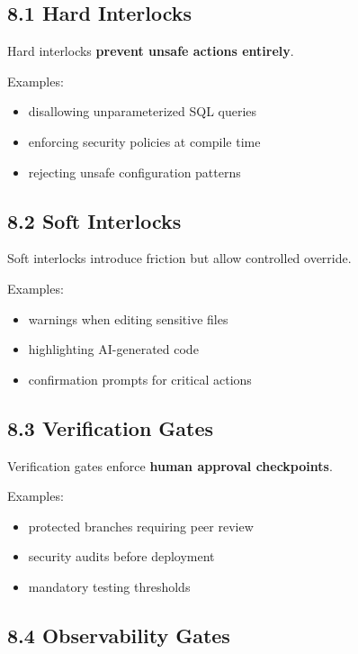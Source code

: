 \documentclass[
]{article}
\providecommand{\tightlist}{%
  \setlength{\itemsep}{0pt}\setlength{\parskip}{0pt}}
\begin{document}
\subsection{8.1 Hard Interlocks}\label{81-hard-interlocks}

Hard interlocks \textbf{prevent unsafe actions entirely}.

Examples:

\begin{itemize}
\tightlist
\item
  disallowing unparameterized SQL queries
\item
  enforcing security policies at compile time
\item
  rejecting unsafe configuration patterns
\end{itemize}

\subsection{8.2 Soft Interlocks}\label{82-soft-interlocks}

Soft interlocks introduce friction but allow controlled override.

Examples:

\begin{itemize}
\tightlist
\item
  warnings when editing sensitive files
\item
  highlighting AI-generated code
\item
  confirmation prompts for critical actions
\end{itemize}

\subsection{8.3 Verification Gates}\label{83-verification-gates}

Verification gates enforce \textbf{human approval checkpoints}.

Examples:

\begin{itemize}
\tightlist
\item
  protected branches requiring peer review
\item
  security audits before deployment
\item
  mandatory testing thresholds
\end{itemize}

\subsection{8.4 Observability Gates}\label{84-observability-gates}
\end{document}
